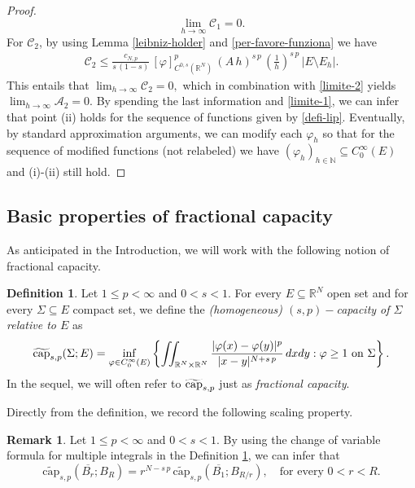 \documentclass{amsart}
\theoremstyle{definition}
\newtheorem{remark}[theorem]{Remark}
\newtheorem{definition}[theorem]{Definition}
\numberwithin{equation}{section}
\begin{document}
\begin{proof}
		\begin{equation} \label{limite-2}
			\lim_{h \to \infty} \mathcal{C}_1 = 0.
		\end{equation}
		For $\mathcal{C}_2$, by using Lemma \ref{leibniz-holder} and \eqref{per-favore-funziona} we have
		\[
		\begin{split}
			\mathcal{C}_2 \le \frac{c_{N,p}}{s\,(1-s)}\,[\varphi]^p_{C^{0,s}(\mathbb{R}^N)}\,\left(A\,h\right)^{s\,p}\, \left(\frac{1}{h}\right)^{s\,p}\,|E \setminus E_h|.
		\end{split}
		\]
		This entails that 
		$
		\lim_{h \to \infty} \mathcal{C}_2 = 0,
		$
	which in combination with \eqref{limite-2} yields 
	$
	\lim_{h \to \infty} \mathcal{A}_2 = 0.
	$
	By spending the last information and \eqref{limite-1}, we can infer that point (ii) holds for the sequence of functions given by \eqref{defi-lip}.  Eventually, by standard approximation arguments, we can modify each $\varphi_h$ so that for the sequence of modified functions (not relabeled) we have $(\varphi_h)_{h  \in \mathbb{N}} \subseteq C^\infty_0(E)$ and (i)-(ii) still hold.  
\end{proof}

\subsection{Basic properties of fractional capacity} \label{subsec:cap}
As anticipated in the Introduction, we will work with the following notion of fractional capacity.
\begin{definition} \label{def:frac-capacity}
	Let $1 \le p < \infty$ and $0 < s < 1$. For every $E \subseteq \mathbb{R}^N$ open set and for every $\Sigma \subseteq E$ compact set, we define the {\it (homogeneous) $(s,p)-$capacity of $\Sigma$ relative to $E$} as
	\[
	\widetilde{{\rm cap}}_{s,p}(\Sigma; E) = \inf_{\varphi \in C^\infty_0(E)} \left\{\iint_{\mathbb{R}^N \times \mathbb{R}^N} \frac{|\varphi(x) - \varphi(y)|^{p}}{|x-y|^{N+s\,p}}\,dxdy : \varphi \ge 1 \mbox{ on } \Sigma \right\}. 
	\] 
	In the sequel, we will often refer to $\widetilde{{\rm cap}}_{s,p}$ just as {\it fractional capacity}.
\end{definition}
Directly from the definition, we record the following scaling property.	
\begin{remark} \label{riscalamento}
	Let $1 \le p < \infty$ and $0 < s < 1$. By using the change of variable formula for multiple integrals in the Definition \ref{def:frac-capacity}, we can infer that 
	\[
	\widetilde{\mathrm{cap}}_{s,p}\left(\overline{B_r}; B_R\right) = r^{N-s\,p}\,\widetilde{\mathrm{cap}}_{s,p}\left(\overline{B_1}; B_{R/r}\right), \quad \mbox{for every } 0 < r < R.
	\]
\end{remark}
\end{document}
